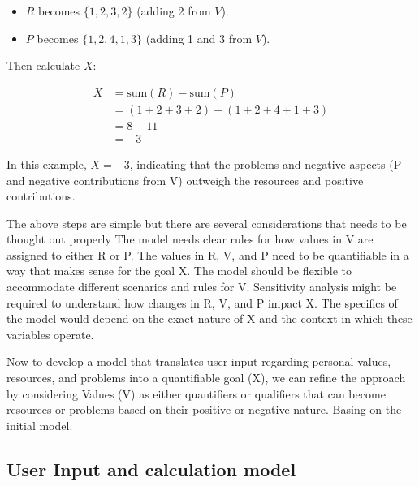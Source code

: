 \documentclass{article}
\begin{document}
\begin{itemize}
    \item \( R \) becomes \( \{1, 2, 3, 2\} \) (adding 2 from \( V \)).
    \item \( P \) becomes \( \{1, 2, 4, 1, 3\} \) (adding 1 and 3 from \( V \)).
\end{itemize}

Then calculate \( X \):

\begin{align}
  X &= \text{sum}(R) - \text{sum}(P) \\
  &= (1+2+3+2) - (1+2+4+1+3) \\
  &= 8 - 11 \\
  &= -3
\end{align}

In this example, \( X = -3 \), indicating that the problems and negative aspects (P and negative contributions from V) outweigh the resources and positive contributions.

The above steps are simple but there are several considerations that needs to be thought out properly The model needs clear rules for how values in V are assigned to either R or P.
The values in R, V, and P need to be quantifiable in a way that makes sense for the goal X.
The model should be flexible to accommodate different scenarios and rules for V.
Sensitivity analysis might be required to understand how changes in R, V, and P impact X. The specifics of the model would depend on the exact nature of X and the context in which these variables operate.

Now to develop a model that translates user input regarding personal values, resources, and problems into a quantifiable goal (X), we can refine the approach by considering Values (V) as either quantifiers or qualifiers that can become resources or problems based on their positive or negative nature. Basing on the initial model.

\subsection{User Input and calculation model}
\end{document}
